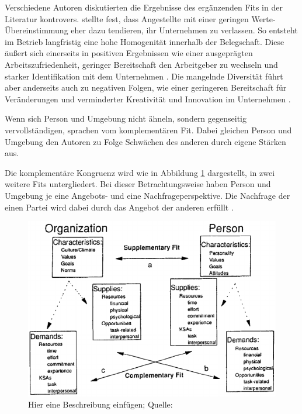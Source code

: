 Verschiedene Autoren diskutierten die Ergebnisse des ergänzenden Fits in der Literatur kontrovers. \textcite[S. 6]{schneider:1987} stellte fest, dass Angestellte mit einer geringen Werte-Übereinstimmung eher dazu tendieren, ihr Unternehmen zu verlassen. So entsteht im Betrieb langfristig eine hohe Homogenität innerhalb der Belegschaft. Diese äußert sich einerseits in positiven Ergebnissen wie einer ausgeprägten Arbeitszufriedenheit, geringer Bereitschaft den Arbeitgeber zu wechseln und starker Identifikation mit dem Unternehmen \cite[S. 25ff.]{kristof:1996}\cite[S. 5]{su:2015}. Die mangelnde Diversität führt aber anderseits auch zu negativen Folgen, wie einer geringeren Bereitschaft für Veränderungen \cite[S. 10]{schneider:1987} und verminderter Kreativität und Innovation im Unternehmen \cite[S. 7]{chatman:1998}.

Wenn sich Person und Umgebung nicht ähneln, sondern gegenseitig vervollständigen, sprachen \textcite[S. 4]{muchinsky:1987} vom komplementären Fit. Dabei gleichen Person und Umgebung den Autoren zu Folge Schwächen des anderen durch eigene Stärken aus.

Die komplementäre Kongruenz wird wie in Abbildung \ref{fig:personEnvironmentFit:supplementaryUndComplementary:abb1} dargestellt, in zwei weitere Fits untergliedert. Bei dieser Betrachtungsweise haben Person und Umgebung je eine Angebots- und eine Nachfrageperspektive. Die Nachfrage der einen Partei wird dabei durch das Angebot der anderen erfüllt \cite[S. 2ff.]{caplan:1987}\cite[S. 2f.]{edwards:1991}\cite[S. 2]{copingAndAdaption:1974}.

\begin{figure}[h]
	\centering
	\includegraphics[width=1\textwidth]{gfx/supplementaryComplementaryFit.png}
	\caption{Hier eine Beschreibung einfügen; Quelle: \cite[S. 4]{kristof:1996}}
	\label{fig:personEnvironmentFit:supplementaryUndComplementary:abb1}
\end{figure}

